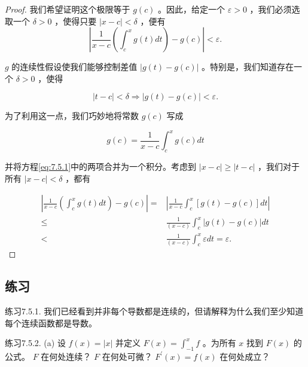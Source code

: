 \begin{proof}
我们希望证明这个极限等于 \(g\left( c\right)\) 。因此，给定一个 \(\varepsilon  > 0\) ，我们必须选取一个 \(\delta  > 0\) ，使得只要 \(\left| {x - c}\right|  < \delta\) ，便有
\begin{equation}
\label{eq:7.5.1}
\left| {\frac{1}{x - c}\left( {{\int }_{c}^{x}g\left( t\right) {dt}}\right)  - g\left( c\right) }\right|  < \varepsilon .
\end{equation}

\(g\) 的连续性假设使我们能够控制差值 \(\left| {g\left( t\right)  - g\left( c\right) }\right|\) 。特别是，我们知道存在一个 \(\delta  > 0\) ，使得

\[
\left| {t - c}\right|  < \delta  \Rightarrow \left| {g\left( t\right)  - g\left( c\right) }\right|  < \varepsilon .
\]

为了利用这一点，我们巧妙地将常数 \(g\left( c\right)\) 写成

\[
g\left( c\right)  = \frac{1}{x - c}{\int }_{c}^{x}g\left( c\right) {dt}
\]

并将方程\eqref{eq:7.5.1}中的两项合并为一个积分。考虑到 \(\left| {x - c}\right|  \geq  \left| {t - c}\right|\) ，我们对于所有 \(\left| {x - c}\right|  < \delta\) ，都有

\begin{align*}
\left| {\frac{1}{x - c}\left( {{\int }_{c}^{x}g\left( t\right) {dt}}\right)  - g\left( c\right) }\right|  = & \left| {\frac{1}{x - c}{\int }_{c}^{x}\left\lbrack  {g\left( t\right)  - g\left( c\right) }\right\rbrack  {dt}}\right|\\
\leq & \frac{1}{\left( x - c\right) }{\int }_{c}^{x}\left| {g\left( t\right)  - g\left( c\right) }\right| {dt}\\
< & \frac{1}{\left( x - c\right) }{\int }_{c}^{x}{\varepsilon dt} = \varepsilon .
\end{align*}
\end{proof}

\subsection{练习}

练习7.5.1. 我们已经看到并非每个导数都是连续的，但请解释为什么我们至少知道每个连续函数都是导数。

练习7.5.2. (a) 设 \(f\left( x\right)  = \left| x\right|\) 并定义 \(F\left( x\right)  = {\int }_{-1}^{x}f\) 。为所有 \(x\) 找到 \(F\left( x\right)\) 的公式。 \(F\) 在何处连续？ \(F\) 在何处可微？ \({F}^{\prime }\left( x\right)  = f\left( x\right)\) 在何处成立？

